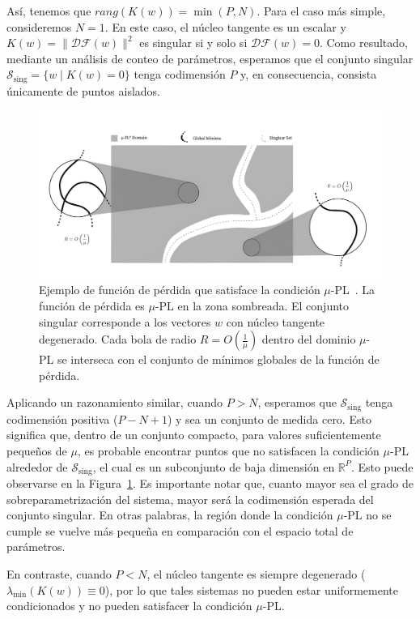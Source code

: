 Así, tenemos que $rang(K(w)) = \min(P, N)$. Para el caso más simple, consideremos $N = 1$. En este caso, el núcleo tangente es un escalar y $K(w) = \| \mathcal{DF}(w) \|^2$ es singular si y solo si $\mathcal{DF}(w) = 0$. Como resultado, mediante un análisis de conteo de parámetros, esperamos que el conjunto singular $\mathcal{S}_{\text{sing}} = \{ w \mid K(w) = 0 \}$ tenga codimensión $P$ y, en consecuencia, consista únicamente de puntos aislados.

\begin{figure}[h]
    \centering
    \includegraphics[width=0.8\linewidth]{img/cosarara2.png}
    \caption[Ejemplo de función de pérdida que satisface la condición $\mu$-PL~\cite{Liu2021}.]{Ejemplo de función de pérdida que satisface la condición $\mu$-PL~\cite{Liu2021}. La función de pérdida es $\mu$-PL en la zona sombreada. El conjunto singular corresponde a los vectores $w$ con núcleo tangente degenerado. Cada bola de radio $R = O\left(\frac{1}{\mu}\right)$ dentro del dominio $\mu$-PL se interseca con el conjunto de mínimos globales de la función de pérdida.}\label{fig:cosarara2}
\end{figure}

Aplicando un razonamiento similar, cuando $P > N$, esperamos que $\mathcal{S}_{\text{sing}}$ tenga codimensión positiva ($P - N + 1$) y sea un conjunto de medida cero. Esto significa que, dentro de un conjunto compacto, para valores suficientemente pequeños de $\mu$, es probable encontrar puntos que no satisfacen la condición $\mu$-PL alrededor de $\mathcal{S}_{\text{sing}}$, el cual es un subconjunto de baja dimensión en $\mathbb{R}^P$. Esto puede observarse en la Figura~\ref{fig:cosarara2}. Es importante notar que, cuanto mayor sea el grado de sobreparametrización del sistema, mayor será la codimensión esperada del conjunto singular. En otras palabras, la región donde la condición $\mu$-PL no se cumple se vuelve más pequeña en comparación con el espacio total de parámetros.

En contraste, cuando $P < N$, el núcleo tangente es siempre degenerado ($\lambda_{\min}(K(w)) \equiv 0$), por lo que tales sistemas no pueden estar uniformemente condicionados y no pueden satisfacer la condición $\mu$-PL.

